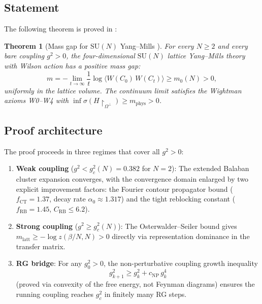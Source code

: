 \documentclass[12pt]{article}
\newtheorem{theorem}{Theorem}[section]
\theoremstyle{definition}
\theoremstyle{remark}
\newcommand{\SU}{\mathrm{SU}}
\newcommand{\gB}{g^2_c}
\begin{document}
\subsection{Statement}

The following theorem is proved in \cite{Olbryk2026MG}:

\begin{theorem}[Mass gap for $\SU(N)$ Yang--Mills {\cite[Thm.~3.2]{Olbryk2026MG}}]
\label{thm:massgap}
For every $N \geq 2$ and every bare coupling $g^2 > 0$,
the four-dimensional $\SU(N)$ lattice Yang--Mills theory with
Wilson action has a positive mass gap:
\[
  m = -\lim_{t \to \infty} \frac{1}{t}
  \log\langle W(C_0)\,W(C_t)\rangle
  \geq m_0(N) > 0,
\]
uniformly in the lattice volume.  The continuum limit satisfies
the Wightman axioms W0--W4 with
$\inf\sigma(H\restriction_{\Omega^\perp}) \geq m_{\mathrm{phys}} > 0$.
\end{theorem}

\subsection{Proof architecture}

The proof proceeds in three regimes that cover all $g^2 > 0$:

\begin{enumerate}[label=(\roman*)]
\item \textbf{Weak coupling} ($g^2 < \gB(N) = 0.382$ for $N=2$):
  The extended Balaban cluster expansion converges, with the
  convergence domain enlarged by two explicit improvement factors:
  the Fourier contour propagator bound ($f_{\mathrm{CT}} = 1.37$,
  decay rate $\alpha_0 \approx 1.317$) and the tight reblocking
  constant ($f_{\mathrm{RB}} = 1.45$, $C_{\mathrm{RB}} \leq 6.2$).

\item \textbf{Strong coupling} ($g^2 \geq \gB(N)$):
  The Osterwalder--Seiler bound gives
  $m_{\mathrm{latt}} \geq -\log z(\beta/N, N) > 0$ directly
  via representation dominance in the transfer matrix.

\item \textbf{RG bridge}: For any $g^2_0 > 0$, the non-perturbative
  coupling growth inequality
  \begin{equation}\label{eq:convexity_growth}
    g^2_{k+1} \geq g^2_k + c_{\mathrm{NP}}\,g^4_k
  \end{equation}
  (proved via convexity of the free energy, not Feynman diagrams)
  ensures the running coupling reaches $\gB$ in finitely many
  RG steps.
\end{enumerate}
\end{document}
